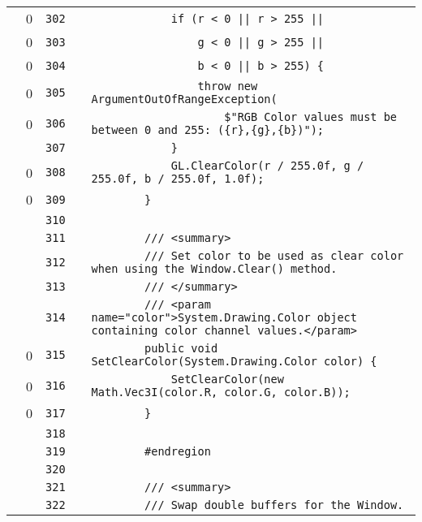 \documentclass[a4paper,landscape,10pt]{article}
\begin{document}
\begin{longtable}[l]{lrrll}
\cellcolor{red} & 0 & \verb~302~ & & \verb~            if (r < 0 || r > 255 ||~\\
\cellcolor{red} & 0 & \verb~303~ & & \verb~                g < 0 || g > 255 ||~\\
\cellcolor{red} & 0 & \verb~304~ & & \verb~                b < 0 || b > 255) {~\\
\cellcolor{red} & 0 & \verb~305~ & & \verb~                throw new ArgumentOutOfRangeException(~\\
\cellcolor{red} & 0 & \verb~306~ & & \verb~                    $"RGB Color values must be between 0 and 255: ({r},{g},{b})");~\\
\cellcolor{gray} &  & \verb~307~ & & \verb~            }~\\
\cellcolor{red} & 0 & \verb~308~ & & \verb~            GL.ClearColor(r / 255.0f, g / 255.0f, b / 255.0f, 1.0f);~\\
\cellcolor{red} & 0 & \verb~309~ & & \verb~        }~\\
\cellcolor{gray} &  & \verb~310~ & & \verb~~\\
\cellcolor{gray} &  & \verb~311~ & & \verb~        /// <summary>~\\
\cellcolor{gray} &  & \verb~312~ & & \verb~        /// Set color to be used as clear color when using the Window.Clear() method.~\\
\cellcolor{gray} &  & \verb~313~ & & \verb~        /// </summary>~\\
\cellcolor{gray} &  & \verb~314~ & & \verb~        /// <param name="color">System.Drawing.Color object containing color channel values.</param>~\\
\cellcolor{red} & 0 & \verb~315~ & & \verb~        public void SetClearColor(System.Drawing.Color color) {~\\
\cellcolor{red} & 0 & \verb~316~ & & \verb~            SetClearColor(new Math.Vec3I(color.R, color.G, color.B));~\\
\cellcolor{red} & 0 & \verb~317~ & & \verb~        }~\\
\cellcolor{gray} &  & \verb~318~ & & \verb~~\\
\cellcolor{gray} &  & \verb~319~ & & \verb~        #endregion~\\
\cellcolor{gray} &  & \verb~320~ & & \verb~~\\
\cellcolor{gray} &  & \verb~321~ & & \verb~        /// <summary>~\\
\cellcolor{gray} &  & \verb~322~ & & \verb~        /// Swap double buffers for the Window.~\\

\end{longtable}
\end{document}
